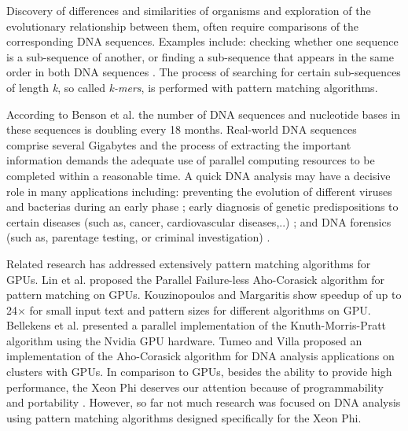 \documentclass[conference]{IEEEtran}
\begin{document}
Discovery of differences and similarities of organisms and exploration of the evolutionary relationship between them, often require comparisons of the corresponding DNA sequences. Examples include: checking whether one sequence is a sub-sequence of another, or finding a sub-sequence that appears in the same order in both DNA sequences \cite{Bentley01102000}. The process of searching for certain sub-sequences of length \emph{k}, so called \emph{k-mers}, is performed with pattern matching algorithms. 

According to Benson et al. \cite{benson2013genbank} the number of DNA sequences and nucleotide bases in these sequences is doubling every 18 months. Real-world DNA sequences comprise several Gigabytes and the process of extracting the important information demands the adequate use of parallel computing resources to be completed within a reasonable time. A quick DNA analysis may have a decisive role in many applications including: preventing the evolution of different viruses and bacterias during an early phase \cite{collins2003vision}; early diagnosis of genetic predispositions to certain diseases (such as, cancer, cardiovascular diseases,..) \cite{mellmann2011prospective}; and DNA forensics (such as, parentage testing, or criminal investigation) \cite{luftig2000dna}.

Related research has addressed extensively pattern matching algorithms for GPUs. Lin et al. \cite{Lin_PFA-C_Algo} proposed the Parallel Failure-less Aho-Corasick algorithm for pattern matching on GPUs. Kouzinopoulos and Margaritis \cite{kouzinopoulos2009string} show speedup of up to 24$\times$ for small input text and pattern sizes for different algorithms on GPU. Bellekens et al. \cite{bellekens2013investigation} presented a parallel implementation of the Knuth-Morris-Pratt algorithm using the Nvidia GPU hardware. Tumeo and Villa \cite{Tumeo_DNA_GPU} proposed an implementation of the Aho-Corasick algorithm for DNA analysis applications on clusters with GPUs. In comparison to GPUs, besides the ability to provide high performance, the Xeon Phi deserves our attention because of programmability \cite{DokulilBBPSB13,PllanaBMNX08} and portability \cite{KesslerDTNRDBTP12}. However, so far not much research was focused on DNA analysis using pattern matching algorithms designed specifically for the Xeon Phi.
\end{document}
